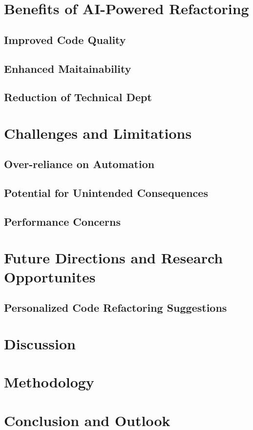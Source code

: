\documentclass[conference]{IEEEtran}
\begin{document}
\section{Benefits of AI-Powered Refactoring}\label{benefits}
\subsection{Improved Code Quality}
\subsection{Enhanced Maitainability}
\subsection{Reduction of Technical Dept}

\section{Challenges and Limitations}
\subsection{Over-reliance on Automation}
\subsection{Potential for Unintended Consequences}
\subsection{Performance Concerns}

\section{Future Directions and Research Opportunites}
\subsection{Personalized Code Refactoring Suggestions}
\section{Discussion}


\section{Methodology}

\section{Conclusion and Outlook}

\nocite{*} %
\end{document}
